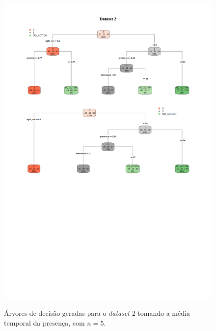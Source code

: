 \begin{figure}[hp]
	\centering
	\caption{Árvores de decisão geradas para o \textit{dataset} 2 tomando a média temporal da presença, com $n=5$.}
  \includegraphics[width=\textwidth]{imagens/teste_learning/5_2.pdf}
  \label{fig:teste_5_2}  
\end{figure}

